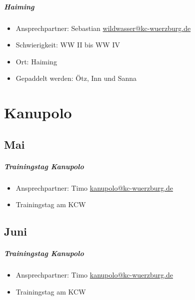 \documentclass[12pt, a4paper]{report}
\begin{document}
\paragraph{Haiming}
\begin{itemize}
    \item Ansprechpartner: Sebastian \href{mailto:wildwasser@kc-wuerzburg.de}{wildwasser@kc-wuerzburg.de}
    \item Schwierigkeit: WW II bis WW IV
    \item Ort: Haiming
    \item Gepaddelt werden: Ötz, Inn und Sanna
\end{itemize}


\chapter*{Kanupolo}
\thispagestyle{Kanupolo}
\pagestyle{Kanupolo}
\section*{Mai}\paragraph{Trainingstag Kanupolo}
\begin{itemize}
    \item Ansprechpartner: Timo \href{mailto:kanupolo@kc-wuerzburg.de}{kanupolo@kc-wuerzburg.de}
    \item Trainingstag am KCW
\end{itemize}

\section*{Juni}\paragraph{Trainingstag Kanupolo}
\begin{itemize}
    \item Ansprechpartner: Timo \href{mailto:kanupolo@kc-wuerzburg.de}{kanupolo@kc-wuerzburg.de}
    \item Trainingstag am KCW
\end{itemize}
\end{document}
